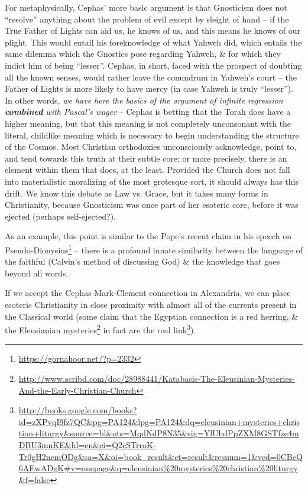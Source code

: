 For metaphysically, Cephas' more basic argument is that Gnosticism does not ``resolve'' anything about the problem of evil except by sleight of hand -- if the True Father of Lights can aid us, he knows of us, and this means he knows of our plight. This would entail his foreknowledge of what Yahweh did, which entails the same dilemma which the Gnostics pose regarding Yahweh, \& for which they indict him of being ``lesser''. Cephas, in short, faced with the prospect of doubting all the known senses, would rather leave the conundrum in Yahweh's court -- the Father of Lights is more likely to have mercy (in case Yahweh is truly ``lesser''). In other words, \emph{we have here the basics of the argument of infinite regression \textbf{combined} with Pascal's wager} -- Cephas is betting that the Torah does have a higher meaning, but that this meaning is not completely unconsonant with the literal, childlike meaning which is necessary to begin understanding the structure of the Cosmos. Most Christian orthodoxies unconsciously acknowledge, point to, and tend towards this truth at their subtle core; or more precisely, there is an element within them that does, at the least. Provided the Church does not fall into materialistic moralizing of the most grotesque sort, it should always has this drift. We know this debate as Law vs. Grace, but it takes many forms in Christianity, because Gnosticism was once part of her esoteric core, before it was ejected (perhaps self-ejected?).

As an example, this point is similar to the Pope's recent claim in his speech on Pseudo-Dionysius\footnote{\url{https://gornahoor.net/?p=2332}} -- there is a profound innate similarity between the language of the faithful (Calvin's method of discussing God) \& the knowledge that goes beyond all words.

If we accept the Cephas-Mark-Clement connection in Alexandria, we can place esoteric Christianity in close proximity with almost all of the currents present in the Classical world (some claim that the Egyptian connection is a red herring, \& the Eleusianian mysteries\footnote{\url{http://www.scribd.com/doc/28988441/Katabasis-The-Eleusinian-Mysteries-And-the-Early-Christian-Church}} in fact are the real link\footnote{\url{http://books.google.com/books?id=zXPvqI9fz7QC&pg=PA124&lpg=PA124&dq=eleusinian+mysteries+christian+liturgy&source=bl&ots=MqdNdP8N35&sig=YlUhdPpZXM8GSTfze4mDBU3mnKE&hl=en&ei=Q2cSTrroK-Tr0gH2ncmODg&sa=X&oi=book_result&ct=result&resnum=1&ved=0CBcQ6AEwADgK\#v=onepage&q=eleusinian\%20mysteries\%20christian\%20liturgy&f=false}}).

